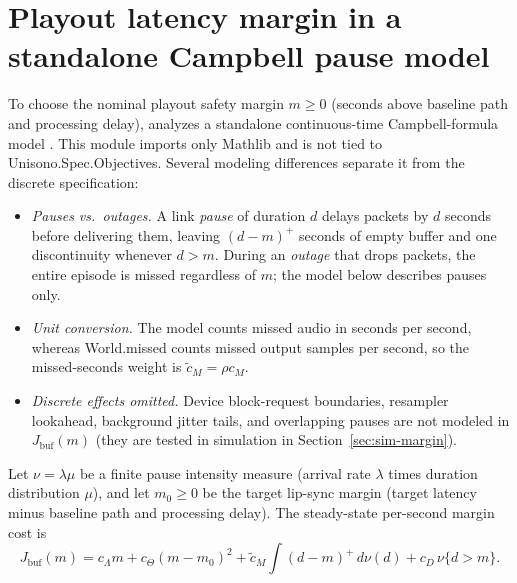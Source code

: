 \documentclass[11pt,a4paper]{article}
\DeclareRobustCommand{\lean}[1]{{\ttfamily\def\_{\textunderscore\allowbreak}#1}}
\theoremstyle{definition}
\begin{document}
\section{Playout latency margin in a standalone Campbell pause model}
\label{sec:level}

To choose the nominal playout safety margin $m \ge 0$ (seconds above baseline
path and processing delay),  analyzes a
standalone continuous-time Campbell-formula model \cite{kingman1993}.
This module imports only Mathlib and is not tied to
\lean{Unisono.Spec.Objectives}. Several modeling differences separate it from
the discrete specification:
\begin{itemize}
\item \emph{Pauses vs.\ outages.} A link \emph{pause} of duration $d$ delays
  packets by $d$ seconds before delivering them, leaving $(d - m)^+$ seconds of
  empty buffer and one discontinuity whenever $d > m$. During an \emph{outage}
  that drops packets, the entire episode is missed regardless of $m$; the model
  below describes pauses only.
\item \emph{Unit conversion.} The model counts missed audio in seconds per
  second, whereas \lean{World.missed} counts missed output samples per second,
  so the missed-seconds weight is $\tilde c_M = \rho c_M$.
\item \emph{Discrete effects omitted.} Device block-request boundaries,
  resampler lookahead, background jitter tails, and overlapping pauses are not
  modeled in $J_{\mathrm{buf}}(m)$ (they are tested in simulation in
  Section~\ref{sec:sim-margin}).
\end{itemize}

Let $\nu = \lambda\mu$ be a finite pause intensity measure (arrival rate
$\lambda$ times duration distribution $\mu$), and let $m_0 \ge 0$ be the target
lip-sync margin (target latency minus baseline path and processing delay). The
steady-state per-second margin cost is
\[
  J_{\mathrm{buf}}(m) = c_\Lambda m + c_\Theta (m - m_0)^2
       + \tilde c_M \int (d - m)^+\,d\nu(d)
       + c_D\,\nu\{d > m\} .
\]
\end{document}
